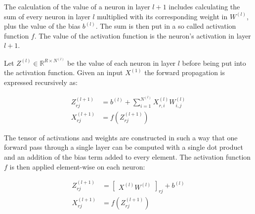 \documentclass[a4paper, twoside]{article}
\begin{document}
The calculation of the value of a neuron in layer $l+1$ includes calculating the sum of every neuron in layer $l$ multiplied with its corresponding weight in $W^{(l)}$, plus the value of the bias $b^{(l)}$. The sum is then put in a so called activation function $f$. The value of the activation function is the neuron's activation in layer $l+1$. \cite{cs231n} \cite{wikiStanford}

Let $Z^{(l)} \in \mathbb{R}^{R \times N^{(l)}}$ be the value of each neuron in layer $l$ before being put into the activation function. Given an input $X^{(1)}$ the forward propagation is expressed recursively as: \cite{cs231n} \cite{wikiStanford}

\begin{align}
Z_{rj}^{(l+1)} & = b^{(l)} + \sum^{N^{(l)}}_{i = 1} X^{(l)}_{r,i} W^{(l)}_{i,j}\\
X_{rj}^{(l+1)} & = f(Z_{rj}^{(l+1)})
\end{align}

The tensor of activations and weights are constructed in such a way that one forward pass through a single layer can be computed with a single dot product and an addition of the bias term added to every element. The activation function $f$ is then applied element-wise on each neuron: \cite{cs231n} \cite{wikiStanford}

\begin{align}
Z_{rj}^{(l+1)} & = \begin{bmatrix}
X^{(l)}W^{(l)}
\end{bmatrix}_{rj}+b^{(l)} \\
X_{rj}^{(l+1)} & = f(Z_{rj}^{(l+1)})
\end{align}
\end{document}
